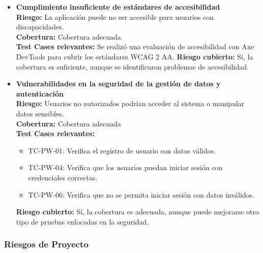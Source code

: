 \documentclass[stu, 12pt, letterpaper, donotrepeattitle, floatsintext, natbib]{apa7}
\begin{document}
\begin{itemize}
    \item \textbf{Cumplimiento insuficiente de estándares de accesibilidad} \\ 
    \textbf{Riesgo:} La aplicación puede no ser accesible para usuarios con discapacidades. \\ 
    \textbf{Cobertura:} Cobertura adecuada\\ 
    \textbf{Test Cases relevantes:} Se realizó una evaluación de accesibilidad con Axe DevTools para cubrir los estándares WCAG 2 AA. 
    \textbf{Riesgo cubierto:} Si, la cobertura es suficiente, aunque se identificaron problemas de accesibilidad.
  
    \item \textbf{Vulnerabilidades en la seguridad de la gestión de datos y autenticación} \\ 
    \textbf{Riesgo:} Usuarios no autorizados podrían acceder al sistema o manipular datos sensibles. \\ 
    \textbf{Cobertura:} Cobertura adecuada \\ 
    \textbf{Test Cases relevantes:} 
    \begin{itemize}
      \item TC-PW-01: Verifica el registro de usuario con datos válidos.
      \item TC-PW-04: Verifica que los usuarios puedan iniciar sesión con credenciales correctas.
      \item TC-PW-06: Verifica que no se permita iniciar sesión con datos inválidos.
    \end{itemize}
    \textbf{Riesgo cubierto:} Sí, la cobertura es adecuada, aunque puede mejorarse otro tipo de pruebas enfocadas en la seguridad.
  \end{itemize}
  

  \subsubsection{Riesgos de Proyecto}
\end{document}
